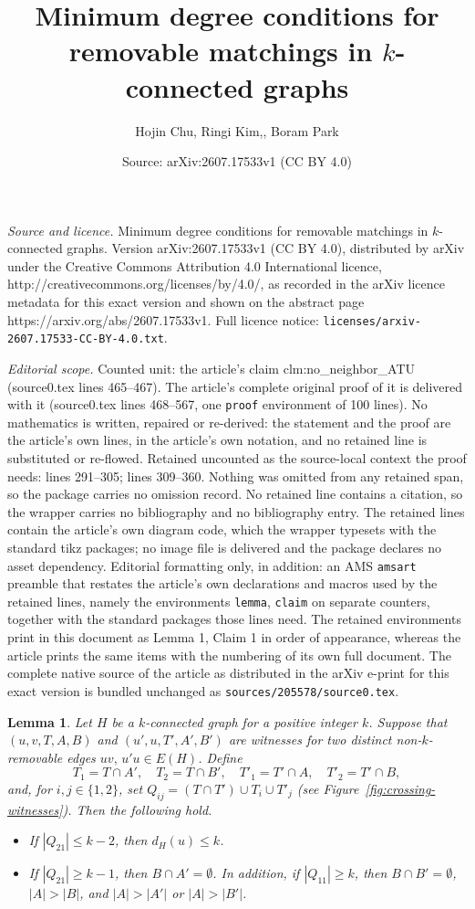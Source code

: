 \documentclass[10pt,a4paper]{amsart}
\title{Minimum degree conditions for removable matchings in $k$-connected graphs}
\author{Hojin Chu, Ringi Kim,, Boram Park}
\date{Source: arXiv:2607.17533v1 (CC BY 4.0)}
\newtheorem{lemma}{Lemma}
\begin{document}
\maketitle

\noindent\emph{Source and licence.} Minimum degree conditions for removable matchings in $k$-connected graphs. Version arXiv:2607.17533v1 (CC BY 4.0), distributed by arXiv under the Creative Commons Attribution 4.0 International licence, http://creativecommons.org/licenses/by/4.0/, as recorded in the arXiv licence metadata for this exact version and shown on the abstract page https://arxiv.org/abs/2607.17533v1. Full licence notice: \texttt{licenses/arxiv-2607.17533-CC-BY-4.0.txt}.\par\smallskip

\noindent\textit{Editorial scope.} Counted unit: the article's claim clm:no\_neighbor\_ATU (source0.tex lines 465--467). The article's complete original proof of it is delivered with it (source0.tex lines 468--567, one \texttt{proof} environment of 100 lines). No mathematics is written, repaired or re-derived: the statement and the proof are the article's own lines, in the article's own notation, and no retained line is substituted or re-flowed.  Retained uncounted as the source-local context the proof needs: lines 291--305; lines 309--360.  Nothing was omitted from any retained span, so the package carries no omission record.  No retained line contains a citation, so the wrapper carries no bibliography and no bibliography entry.  The retained lines contain the article's own diagram code, which the wrapper typesets with the standard tikz packages; no image file is delivered and the package declares no asset dependency.  Editorial formatting only, in addition: an AMS \texttt{amsart} preamble that restates the article's own declarations and macros used by the retained lines, namely the environments \texttt{lemma}, \texttt{claim} on separate counters, together with the standard packages those lines need.  The retained environments print in this document as Lemma 1, Claim 1 in order of appearance, whereas the article prints the same items with the numbering of its own full document.  The complete native source of the article as distributed in the arXiv e-print for this exact version is bundled unchanged as \texttt{sources/205578/source0.tex}.
\begin{lemma}\label{lem:uncrossing}
Let $H$ be a $k$-connected graph for a positive integer $k$.
Suppose that $(u,v,T,A,B)$ and $(u',u,T',A',B')$ are witnesses for two distinct non-$k$-removable edges $uv,\,u'u\in E(H)$. 
Define
\[
  T_1=T\cap A',\quad T_2=T\cap B',\quad T'_1=T'\cap A,\quad T'_2=T'\cap B,
\]
and, for $i,j\in\{1,2\}$, set $Q_{ij}=(T\cap T')\cup T_i\cup T'_j$ (see
Figure~\ref{fig:crossing-witnesses}). 
Then the following hold.
\begin{itemize}
\item[(i)] If $|Q_{21}|\le k-2$, then $d_H(u)\le k$.
\item[(ii)] If $|Q_{21}|\ge k-1$, then $B\cap A'=\emptyset$. In addition, if $|Q_{11}|\ge k$, then $B\cap B'=\emptyset$, $|A|>|B|$, and $|A|>|A'|$ or $|A|>|B'|$.
\end{itemize}
\end{lemma}
\end{document}
